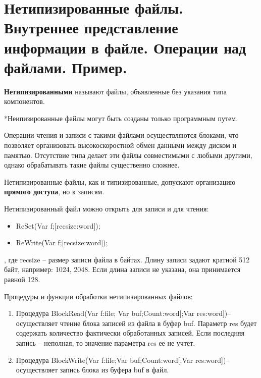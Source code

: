 
\newpage\section{Нетипизированные  файлы.  Внутреннее  представление  информации  в  файле.  Операции 
над файлами. Пример. }

\begin{myquote}
            
\end{myquote}

{\bf{Нетипизированными}} называют файлы, объявленные без указания типа компонентов.

*Неипизированные файлы могут быть созданы только программным путем.

Операции чтения и записи с такими файлами осуществляются блоками, что позволяет организовать высокоскоростной обмен данными между диском и памятью. Отсутствие типа делает эти файлы совместимыми с любыми другими, однако обрабатывать такие файлы существенно сложнее.

Нетипизированные файлы, как и типизированные, допускают организацию {\bf{прямого доступа}}, но к записям.

Нетипизированный файл можно открыть для записи и для чтения:
\begin{itemize}
         \item ReSet(Var f;[recsize:word]);
         \item ReWrite(Var f;[recsize:word]);
\end{itemize}

, где recsize – размер записи файла в байтах. Длину записи задают кратной 512 байт, например:  1024, 2048. Если длина записи не указана, она принимается равной 128.

Процедуры и функции обработки нетипизированных файлов:
\begin{enumerate}
    \item Процедура BlockRead(Var f:file; Var buf;Count:word[;Var res:word])– осуществляет чтение блока записей из файла в буфер buf. 
Параметр res будет содержать количество фактически обработанных записей. Если последняя запись – неполная, то значение параметра res ее не учтет. 
    \item Процедура BlockWrite(Var f:file;Var buf;Count:word[;Var res:word])– осуществляет запись блока из буфера buf в файл.
\end{enumerate}

